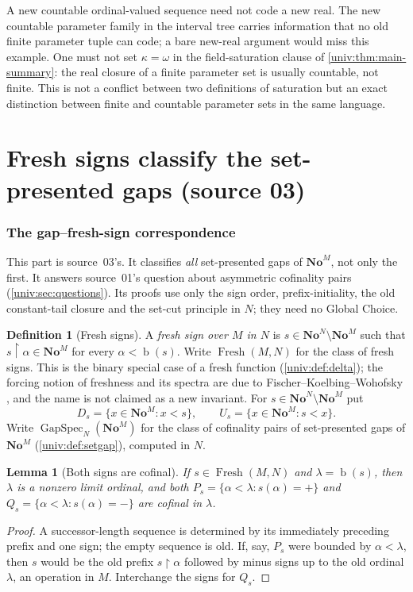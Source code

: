 \documentclass[11pt,letterpaper]{article}
\numberwithin{equation}{section}
\newtheorem{lemma}[lemma]{Lemma}
\theoremstyle{definition}
\newtheorem{definition}[definition]{Definition}
\theoremstyle{remark}
\newcommand{\No}{\mathbf{No}}
\newcommand{\NoM}{\No^{M}}
\newcommand{\NoN}{\No^{N}}
\newcommand{\bd}{\operatorname{b}}
\newcommand{\Fresh}{\operatorname{Fresh}}
\newcommand{\GapSpec}{\operatorname{GapSpec}}
\newcommand{\res}{\mathbin{\upharpoonright}}
\begin{document}
A new countable ordinal-valued sequence need not code a new real. The new
countable parameter family in the interval tree carries information that no
old finite parameter tuple can code; a bare new-real argument would miss this
example. One must not set $\kappa=\omega$ in the field-saturation clause of
\cref{univ:thm:main-summary}: the real closure of a finite parameter set is
usually countable, not finite. This is not a conflict between two definitions
of saturation but an exact distinction between finite and countable parameter
sets in the same language.

\part{Fresh signs classify the set-presented gaps (source 03)}\label{univ:part:gaps}

\section{The gap--fresh-sign correspondence}\label{univ:sec:fresh}

This part is source~03's. It classifies \emph{all} set-presented gaps of
$\NoM$, not only the first. It answers source~01's question about asymmetric
cofinality pairs (\cref{univ:sec:questions}). Its proofs use only the sign
order, prefix-initiality, the old constant-tail closure and the set-cut
principle in $N$; they need no Global Choice.

\begin{definition}[Fresh signs]\label{univ:def:freshsign}
A \emph{fresh sign over $M$ in $N$} is $s\in\NoN\setminus\NoM$ such that
$s\res\alpha\in\NoM$ for every $\alpha<\bd(s)$. Write $\Fresh(M,N)$ for the
class of fresh signs. This is the binary special case of a fresh function
(\cref{univ:def:delta}); the forcing notion of freshness and its spectra are
due to Fischer--Koelbing--Wohofsky \cite{FKW}, and the name is not claimed as a
new invariant. For $s\in\NoN\setminus\NoM$ put
\[
 D_s=\{x\in\NoM:x<s\},\qquad U_s=\{x\in\NoM:s<x\}.
\]
Write $\GapSpec_N(\NoM)$ for the class of cofinality pairs of set-presented
gaps of $\NoM$ (\cref{univ:def:setgap}), computed in $N$.
\end{definition}

\begin{lemma}[Both signs are cofinal]\label{univ:lem:signscofinal}
If $s\in\Fresh(M,N)$ and $\lambda=\bd(s)$, then $\lambda$ is a nonzero limit
ordinal, and both $P_s=\{\alpha<\lambda:s(\alpha)=+\}$ and
$Q_s=\{\alpha<\lambda:s(\alpha)=-\}$ are cofinal in $\lambda$.
\end{lemma}
\begin{proof}
A successor-length sequence is determined by its immediately preceding prefix
and one sign; the empty sequence is old. If, say, $P_s$ were bounded by
$\alpha<\lambda$, then $s$ would be the old prefix $s\res\alpha$ followed by
minus signs up to the old ordinal $\lambda$, an operation in $M$. Interchange
the signs for $Q_s$.
\end{proof}
\end{document}
